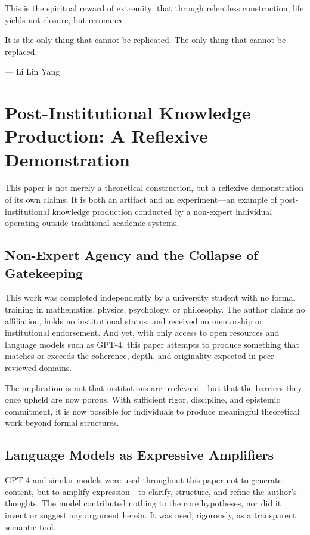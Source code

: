 \documentclass[12pt]{article}
\begin{document}
This is the spiritual reward of extremity: that through relentless construction, life yields not closure, but resonance.

It is the only thing that cannot be replicated. The only thing that cannot be replaced.

\bigskip
\begin{flushright}
--- Li Lin Yang
\end{flushright}
\section{Post-Institutional Knowledge Production: A Reflexive Demonstration}

This paper is not merely a theoretical construction, but a reflexive demonstration of its own claims. It is both an artifact and an experiment—an example of post-institutional knowledge production conducted by a non-expert individual operating outside traditional academic systems.

\subsection{Non-Expert Agency and the Collapse of Gatekeeping}

This work was completed independently by a university student with no formal training in mathematics, physics, psychology, or philosophy. The author claims no affiliation, holds no institutional status, and received no mentorship or institutional endorsement. And yet, with only access to open resources and language models such as GPT-4, this paper attempts to produce something that matches or exceeds the coherence, depth, and originality expected in peer-reviewed domains.

The implication is not that institutions are irrelevant—but that the barriers they once upheld are now porous. With sufficient rigor, discipline, and epistemic commitment, it is now possible for individuals to produce meaningful theoretical work beyond formal structures.

\subsection{Language Models as Expressive Amplifiers}

GPT-4 and similar models were used throughout this paper not to generate content, but to amplify expression—to clarify, structure, and refine the author’s thoughts. The model contributed nothing to the core hypotheses, nor did it invent or suggest any argument herein. It was used, rigorously, as a transparent semantic tool.
\end{document}
